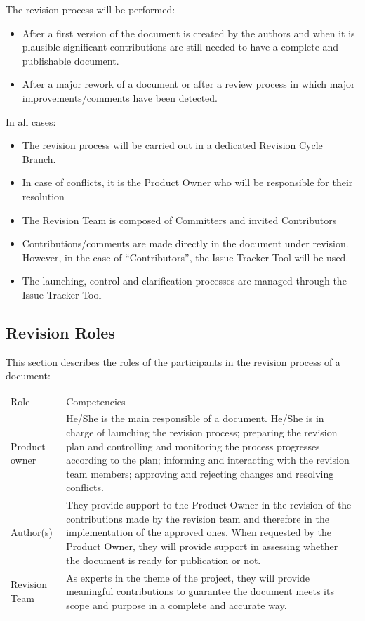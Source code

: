 \documentclass{template/openetcs_article}
\begin{document}
The revision process will be performed:
\begin{itemize}
\item After a first version of the document is created by the authors and when it is plausible significant contributions are still needed to have a complete and publishable document.
\item After a major rework of a document or after a review process in which major improvements/comments have been detected.
\end{itemize}
In all cases:
\begin{itemize}
\item The revision process will be carried out in a dedicated Revision Cycle Branch.
\item In case of conflicts, it is the Product Owner who will be responsible for their resolution
\item The Revision Team is composed of Committers and invited Contributors
\item Contributions/comments are made directly in the document under revision. However, in the case of “Contributors”, the Issue Tracker Tool will be used.
\item The launching, control and clarification processes are managed through the Issue Tracker Tool
\end{itemize}

\subsection{Revision Roles}

This section describes the roles of the participants in the revision process of a document:

\begin{flushleft}
\begin{tabular}{|m{3cm}|m{11cm}|}
\hline
\rowcolor{myblue}
\multicolumn{2}{|c|}{Roles} \\\hline
\rowcolor{lightgray}
Role &
Competencies 
\\\hline
Product owner &
He/She is the main responsible of a document. 
He/She is in charge of launching the revision process; preparing the revision plan and controlling and monitoring the process progresses according to the plan; informing and interacting with the revision team members; approving and rejecting changes and resolving conflicts.
\\\hline
Author(s) & 
They provide support to the Product Owner in the revision of the contributions made by the revision team and therefore in the implementation of the approved ones. When requested by the Product Owner, they will provide support in assessing whether the document is ready for publication or not.
\\\hline
Revision Team &
As experts in the theme of the project, they will provide meaningful contributions to guarantee the document meets its scope and purpose  in a complete and accurate way.
\\\hline
\end{tabular}
\end{flushleft}
\end{document}
